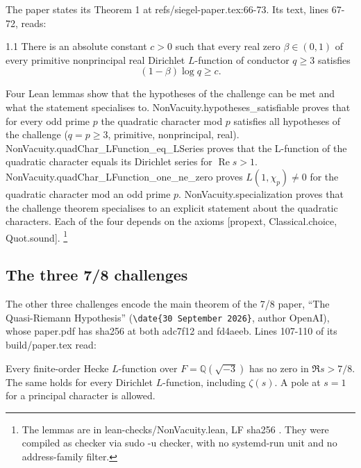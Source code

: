 The paper states its Theorem 1 at refs/siegel-paper.tex:66-73.
Its text, lines 67-72, reads:
\begin{paperquote}{1.1}
There is an absolute constant $c>0$ such that every real zero
$\beta\in(0,1)$ of every primitive nonprincipal real Dirichlet
$L$-function of conductor $q\ge3$ satisfies
\begin{equation}\label{eq:main}
 (1-\beta)\log q\ge c.
\end{equation}
\end{paperquote}

Four Lean lemmas show that the hypotheses of the challenge can be met and what the statement specialises to.
NonVacuity.hypotheses\_satisfiable proves that for every odd prime $p$ the quadratic character mod $p$ satisfies all hypotheses of the challenge ($q = p \ge 3$, primitive, nonprincipal, real).
NonVacuity.quadChar\_LFunction\_eq\_LSeries proves that the L-function of the quadratic character equals its Dirichlet series for $\operatorname{Re} s > 1$.
NonVacuity.quadChar\_LFunction\_one\_ne\_zero proves $L(1, \chi_p) \ne 0$ for the quadratic character mod an odd prime $p$.
NonVacuity.specialization proves that the challenge theorem specialises to an explicit statement about the quadratic characters.
Each of the four depends on the axioms [propext, Classical.choice, Quot.sound].
\footnote{The lemmas are in lean-checks/NonVacuity.lean, LF sha256 .
They were compiled as checker via sudo -u checker, with no systemd-run unit and no address-family filter.
}

\subsection{The three 7/8 challenges}

The other three challenges encode the main theorem of the 7/8 paper, ``The Quasi-Riemann Hypothesis'' \cite{openai-qrh-2026} (\texttt{\textbackslash date\{30 September 2026\}}, author OpenAI), whose paper.pdf has sha256  at both adc7f12 and fd4aeeb.
Lines 107-110 of its build/paper.tex read:
\begin{paperquote}{}
Every finite-order Hecke $L$-function over
$F=\mathbb Q(\sqrt{-3})$ has no zero in $\Re s>7/8$.
The same holds for every Dirichlet $L$-function, including $\zeta(s)$.
A pole at $s=1$ for a principal character is allowed.
\end{paperquote}

